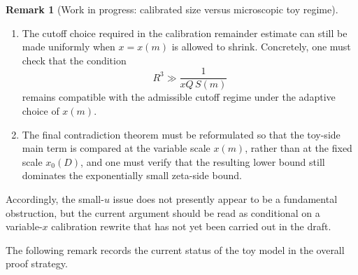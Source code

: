 \documentclass[11pt,a4paper]{amsart}
\theoremstyle{plain}
\theoremstyle{definition}
\newtheorem{remark}[theorem]{Remark}
\begin{document}
\begin{remark}[Work in progress: calibrated size versus microscopic toy regime]
\begin{enumerate}
\item The cutoff choice required in the calibration remainder estimate can
still be made uniformly when $x=x(m)$ is allowed to shrink.  Concretely, one
must check that the condition
\[
R^3 \gg \frac{1}{xQ\,S(m)}
\]
remains compatible with the admissible cutoff regime under the adaptive choice
of $x(m)$.

\item The final contradiction theorem must be reformulated so that the toy-side
main term is compared at the variable scale $x(m)$, rather than at the fixed
scale $x_0(D)$, and one must verify that the resulting lower bound still
dominates the exponentially small zeta-side bound.
\end{enumerate}

Accordingly, the small-$u$ issue does not presently appear to be a
fundamental obstruction, but the current argument should be read as
conditional on a variable-$x$ calibration rewrite that has not yet been
carried out in the draft.
\end{remark}

The following remark records the current status of the toy model in the
overall proof strategy.
\end{document}
